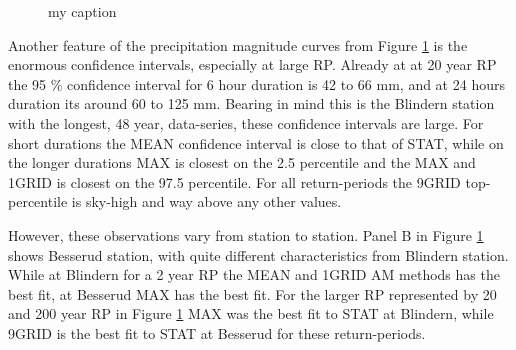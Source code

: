 \begin{figure}
\caption{my caption}
\label{fig:idf_blindern_2_200}
\end{figure}

Another feature of the precipitation magnitude curves from Figure \ref{fig:idf_blindern_2_200} is the enormous confidence intervals, especially at large RP. Already at at 20 year RP the 95 \% confidence interval for 6 hour duration is 42 to 66 mm, and at 24 hours duration its around 60 to 125 mm. Bearing in mind this is the Blindern station with the longest, 48 year, data-series, these confidence intervals are large. For short durations the MEAN confidence interval is close to that of STAT, while on the longer durations MAX is closest on the 2.5 percentile and the MAX and 1GRID is closest on the 97.5 percentile. For all return-periods the 9GRID top-percentile is sky-high and way above any other values.

However, these observations vary from station to station. Panel B in Figure \ref{fig:idf_blindern_2_200} shows Besserud station, with quite different characteristics from Blindern station. While at Blindern for a 2 year RP the MEAN and 1GRID AM methods has the best fit, at Besserud MAX has the best fit. For the larger RP represented by 20 and 200 year RP in Figure \ref{fig:idf_blindern_2_200} MAX was the best fit to STAT at Blindern, while 9GRID is the best fit to STAT at Besserud for these return-periods.     

